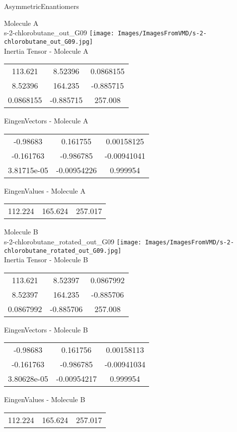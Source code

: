 \vtab[-2cm]
\begin{center}
{\large AsymmetricEnantiomers}
\end{center}
\begin{multicols}{2}
\begin{center}
Molecule A \\ 
s-2-chlorobutane\_out\_G09
\texttt{[image: Images/ImagesFromVMD/s-2-chlorobutane\_out\_G09.jpg]}
\\
Inertia Tensor - Molecule A \\
\vtab
\begin{tabular}{|c c c|}
113.621	 & 	8.52396	 & 	0.0868155	 \\
8.52396	 & 	164.235	 & 	-0.885715	 \\
0.0868155	 & 	-0.885715	 & 	257.008
\end{tabular}

\vtab
 EingenVectors - Molecule A     \\
\vtab
\begin{tabular}{|c c c|}
-0.98683	 & 	0.161755	 & 	0.00158125	 \\
-0.161763	 & 	-0.986785	 & 	-0.00941041	 \\
3.81715e-05	 & 	-0.00954226	 & 	0.999954
\end{tabular}

\vtab
 EingenValues - Molecule A     \\
\vtab
\begin{tabular}{|c c c|}
112.224	 & 	165.624	 & 	257.017
\end{tabular}
\columnbreak

Molecule B \\ 
s-2-chlorobutane\_rotated\_out\_G09
\texttt{[image: Images/ImagesFromVMD/s-2-chlorobutane\_rotated\_out\_G09.jpg]}
\\
Inertia Tensor - Molecule B \\
\vtab
\begin{tabular}{|c c c|}
113.621	 & 	8.52397	 & 	0.0867992	 \\
8.52397	 & 	164.235	 & 	-0.885706	 \\
0.0867992	 & 	-0.885706	 & 	257.008
\end{tabular}

\vtab
 EingenVectors - Molecule B     \\
\vtab
\begin{tabular}{|c c c|}
-0.98683	 & 	0.161756	 & 	0.00158113	 \\
-0.161763	 & 	-0.986785	 & 	-0.00941034	 \\
3.80628e-05	 & 	-0.00954217	 & 	0.999954
\end{tabular}

\vtab
 EingenValues - Molecule B     \\
\vtab
\begin{tabular}{|c c c|}
112.224	 & 	165.624	 & 	257.017
\end{tabular}

\end{center}
\end{multicols}
